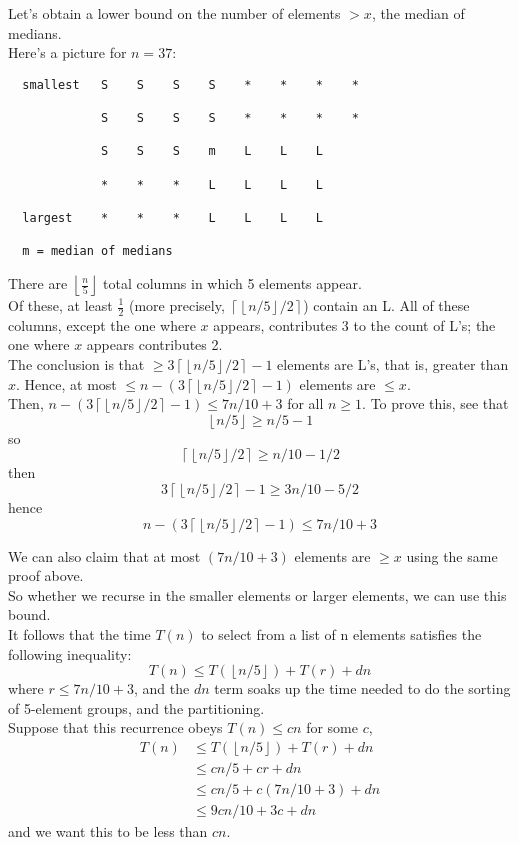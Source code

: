 \documentclass[12pt]{article}
\theoremstyle{plain}
\theoremstyle{definition}
\newcommand{\floor}[1]{\ensuremath{\left\lfloor #1 \right\rfloor}}
\newcommand{\ceil}[1]{\ensuremath{\left\lceil #1 \right\rceil}}
\begin{document}
Let's obtain a lower bound on the number of elements $> x$, the median of medians. \\
Here's a picture for $n = 37$:
\begin{verbatim}
  smallest   S    S    S    S    *    *    *    *

             S    S    S    S    *    *    *    *

             S    S    S    m    L    L    L

             *    *    *    L    L    L    L

  largest    *    *    *    L    L    L    L

  m = median of medians
\end{verbatim}

There are $\floor{\frac{n}{5}}$ total columns in which 5 elements appear. \\
Of these, at least $\frac{1}{2}$ (more precisely, $\ceil{\floor{n/5}/2}$) contain an L.
All of these columns, except the one where $x$ appears, contributes 3 to the count of L's; the one where $x$ appears contributes 2. \\

The conclusion is that $\geq 3\ceil{\floor{n/5}/2} - 1$ elements are L's, that is, greater than $x$.
Hence, at most $\leq n - (3\ceil{\floor{n/5}/2} - 1)$ elements are $\leq x$. \\

Then, $n - (3\ceil{\floor{n/5}/2} - 1) \leq 7n/10 + 3$ for all $n \geq 1$.
To prove this, see that
$$\floor{n/5} \geq n/5 - 1$$
so
$$\ceil{\floor{n/5}/2} \geq n/10 - 1/2$$
then
$$3\ceil{\floor{n/5}/2} - 1 \geq 3n/10 - 5/2$$
hence
$$n - (3\ceil{\floor{n/5}/2} - 1) \leq 7n/10 + 3$$

We can also claim that at most $(7n/10 + 3)$ elements are $\geq x$ using the same proof above. \\
So whether we recurse in the smaller elements or larger elements, we can use this bound. \\

It follows that the time $T(n)$ to select from a list of n elements satisfies the following inequality:
$$T(n) \leq T(\floor{n/5}) + T(r) + dn$$
where $r \leq 7n/10 + 3$, and the $dn$ term soaks up the time needed to do the sorting of 5-element groups, and the partitioning. \\

Suppose that this recurrence obeys $T(n) \leq cn$ for some $c$,
\begin{align*}
T(n) &\leq T(\floor{n/5}) + T(r) + dn \\
&\leq cn/5 + cr + dn \\
&\leq cn/5 + c(7n/10 + 3) + dn \\
&\leq 9cn/10 + 3c + dn
\end{align*}
and we want this to be less than $cn$. \\
\end{document}

